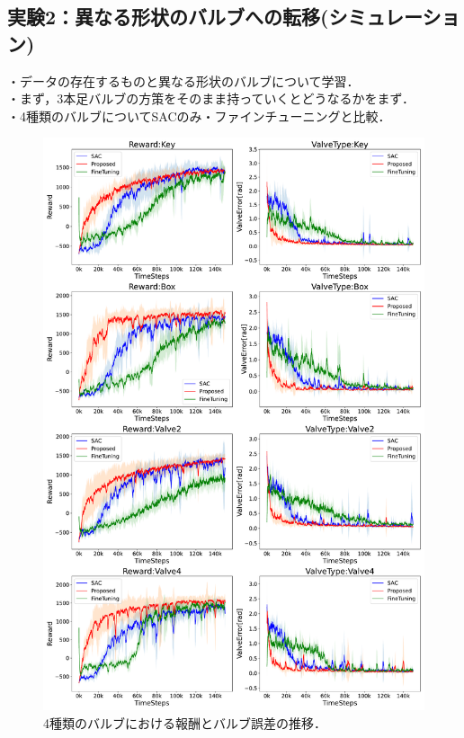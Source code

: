 \documentclass[dvipdfmx]{ampbt_nomag}
\begin{document}
\subsection{実験2：異なる形状のバルブへの転移(シミュレーション)}
・データの存在するものと異なる形状のバルブについて学習．\\
・まず，3本足バルブの方策をそのまま持っていくとどうなるかをまず．\\
・4種類のバルブについてSACのみ・ファインチューニングと比較．\\

\begin{figure}[H]
  \centering
  \includegraphics[width=16cm]
       {asset/img/SimTurn180Other.pdf}
  \caption{4種類のバルブにおける報酬とバルブ誤差の推移．}
  \label{dclaw_mujoco}
\end{figure}
\end{document}
